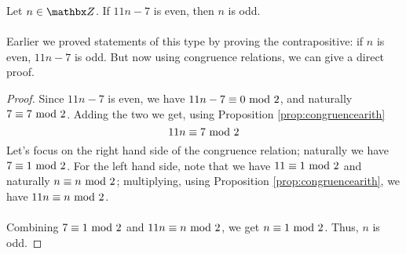 \begin{example}
Let $n \in \zz$. If $11n - 7$ is even, then $n$ is odd.\\
\\
Earlier we proved statements of this type by proving the contrapositive: if $n$ is even, $11n - 7$ is odd. But now using congruence relations, we can give a direct proof.
\end{example}
\begin{proof}
Since $11n - 7$ is even, we have $11n - 7 \equiv 0 \text{ mod }{2}$, and naturally $7 \equiv 7 \text{ mod }{2}$. Adding the two we get, using Proposition \ref{prop:congruencearith}
\[11n \equiv 7 \text{ mod }{2}\]
Let's focus on the right hand side of the congruence relation; naturally we have $7 \equiv 1 \text{ mod }{2}$. For the left hand side, note that we have $11 \equiv 1 \text{ mod }{2}$ and naturally $n \equiv n \text{ mod }{2}$; multiplying, using Proposition \ref{prop:congruencearith}, we have $11n \equiv n \text{ mod }{2}$.\\
\\
Combining $7 \equiv 1 \text{ mod }{2}$ and $11n \equiv n \text{ mod }{2}$, we get $n \equiv 1 \text{ mod }{2}$. Thus, $n$ is odd. 
\end{proof}

\vspace*{1em}

